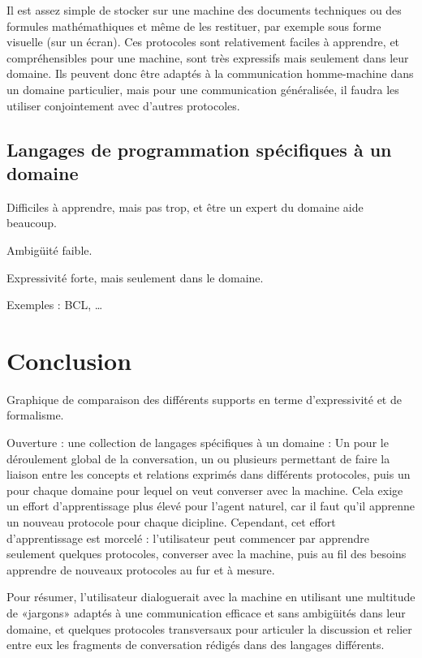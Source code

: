 \documentclass[french,a4paper]{article}
\begin{document}
Il est assez simple de stocker sur une machine des documents techniques ou des formules mathémathiques et même de les restituer, par exemple
sous forme visuelle (sur un écran). Ces protocoles sont relativement faciles à apprendre, et compréhensibles pour une machine, sont très
expressifs mais seulement dans leur domaine. Ils peuvent donc être adaptés à la communication homme-machine dans un domaine particulier,
mais pour une communication généralisée, il faudra les utiliser conjointement avec d'autres protocoles.

\subsection{Langages de programmation spécifiques à un domaine}

Difficiles à apprendre, mais pas trop, et être un expert du domaine aide beaucoup.

Ambigüité faible.

Expressivité forte, mais seulement dans le domaine.

Exemples : BCL, …

\section{Conclusion}
Graphique de comparaison des différents supports en terme d'expressivité et de formalisme.

Ouverture : une collection de langages spécifiques à un domaine : Un pour le déroulement global de la conversation, un ou plusieurs
permettant de faire la liaison entre les concepts et relations exprimés dans différents protocoles, puis un pour chaque domaine pour lequel
on veut converser avec la machine. Cela exige un effort d'apprentissage plus élevé pour l'agent naturel, car il faut qu'il apprenne un
nouveau protocole pour chaque dicipline. Cependant, cet effort d'apprentissage est morcelé : l'utilisateur peut commencer par apprendre
seulement quelques protocoles, converser avec la machine, puis au fil des besoins apprendre de nouveaux protocoles au fur et à mesure.

Pour résumer, l'utilisateur dialoguerait avec la machine en utilisant une multitude de «jargons» adaptés à une communication efficace et
sans ambigüités dans leur domaine, et quelques protocoles transversaux pour articuler la discussion et relier entre eux les fragments de
conversation rédigés dans des langages différents.

\end{document}
